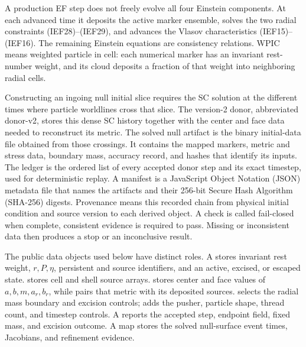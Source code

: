 A production EF step does not freely evolve all four Einstein components.
At each advanced time it deposits the active marker ensemble, solves the two
radial constraints (IEF28)--(IEF29), and advances the Vlasov characteristics
(IEF15)--(IEF16).  The remaining Einstein equations are consistency
relations.  WPIC means weighted particle in cell: each numerical marker has
an invariant rest-number weight, and its cloud deposits a fraction of that
weight into neighboring radial cells.

Constructing an ingoing null initial slice requires the SC solution at the
different times where particle worldlines cross that slice.  The version-2
donor, abbreviated donor-v2, stores this dense SC history together with the
center and face data needed to reconstruct its metric.  The solved null
artifact is the binary initial-data file obtained from those crossings.  It
contains the mapped markers, metric and stress data, boundary mass, accuracy
record, and hashes that identify its inputs.
The ledger is the ordered list of every accepted donor step and its exact
timestep, used for deterministic replay.  A manifest is a JavaScript Object
Notation (JSON) metadata file that names the artifacts and their 256-bit
Secure Hash Algorithm (SHA-256) digests.  Provenance means this recorded chain
from physical initial condition and source version to each derived object.
A check is called fail-closed when complete, consistent evidence is required
to pass.  Missing or inconsistent data then produces a stop or an
inconclusive result.

The public data objects used below have distinct roles.  A 
stores invariant rest weight, \(r,P,\eta\), persistent and source identifiers,
and an active, excised, or escaped state.   stores cell
and shell source arrays.   stores center and face values of
\(a,b,m,a_r,b_r\), while  pairs that metric with its deposited
sources.   selects the radial mass boundary and
excision controls;  adds the pusher, particle shape,
thread count, and timestep controls.  A  reports the accepted
step, endpoint field, fixed mass, and excision outcome.  A map
 stores the solved null-surface event times, Jacobians,
and refinement evidence.

